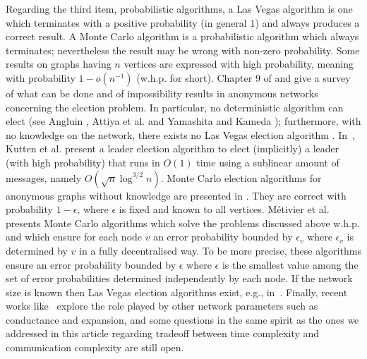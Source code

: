\documentclass[11pt,envcountsame,letterpaper]{llncs}
\begin{document}
Regarding the third item, probabilistic algorithms, a Las Vegas algorithm is one which terminates
with a positive probability (in general $1$) and always produces
 a correct result.
A Monte Carlo algorithm is a probabilistic algorithm which always
terminates; nevertheless the result may be wrong with non-zero
probability.
Some results on graphs having
$n$ vertices are expressed with high probability,
meaning with probability $1-o(n^{-1})$ (w.h.p. for short).
Chapter $9$ of \cite{Tel} and \cite{lavault}
give a survey of what can be done and of
impossibility results in anonymous networks concerning the election problem.
  In particular, no
deterministic algorithm can elect (see Angluin \cite{Angluin}, Attiya
et al. \cite{ASW} and Yamashita and Kameda \cite{YK88}); furthermore,
with no knowledge on the network, there exists no Las Vegas election
algorithm \cite{IR90}. 
In~\cite{KuPPRT15}, Kutten et al. present a leader election algorithm to elect (implicitly) a leader (with high probability) that runs in $O(1)$ time using a sublinear amount of messages, namely $O(\sqrt{n}\log^{3/2} n)$.
Monte Carlo election algorithms for anonymous
graphs without knowledge are presented in \cite{IR90,AM94,SS94}.
They are correct
with probability $1-\epsilon$, where $\epsilon$ is fixed
and known to all vertices. M{\'e}tivier et al.~\cite{MRZ15} presents
 Monte Carlo algorithms
which solve the problems discussed above w.h.p. 
 and which ensure for each node $v$ 
an error probability bounded by $\epsilon_v$ where $\epsilon_v$ is
determined by $v$ in a fully decentralised way. To be more precise,
these 
algorithms ensure an error probability bounded by $\epsilon$
where $\epsilon$ 
is the smallest value among the set of error probabilities
determined  independently by each node.
If the network size is known then Las Vegas election algorithms exist, e.g., in~\cite{IR90}.
Finally, recent works like~\cite{GRS18} explore the role played by other network parameters such as conductance and expansion, and some questions in the same spirit as the ones we addressed in this article regarding tradeoff between time complexity and communication complexity are still open.
\end{document}
